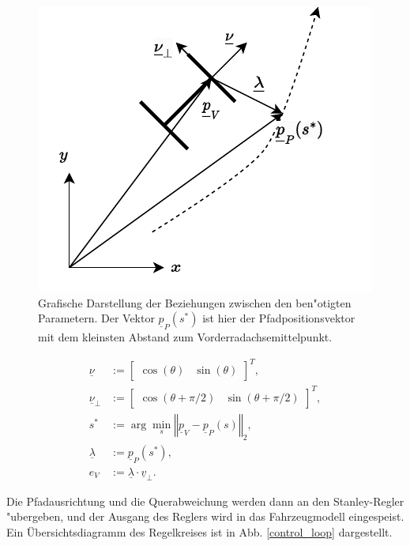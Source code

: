 \documentclass[arbeit=studie,oneside,BCOR=12mm]{ArbeitRST}
\begin{document}
\begin{figure}[h]
    \centering
    \includegraphics{dot_product}
    \caption{Grafische Darstellung der Beziehungen zwischen den ben"otigten
    Parametern. Der Vektor $\underline{p}_P(s^*)$ ist hier der Pfadpositionsvektor mit dem
    kleinsten Abstand zum Vorderradachsemittelpunkt.}
    \label{algorithm}
\end{figure}

\begin{subequations}
\begin{align}
    \underline{\nu} &:= \begin{bmatrix} \cos(\theta) & \sin(\theta) \end{bmatrix}^T, \\
        \underline{\nu}_{\perp} &:= \begin{bmatrix} \cos(\theta + \pi/2) & \sin(\theta + \pi/2) \end{bmatrix}^T, \\
            s^* &:= \arg\min_{s}  \left\Vert\underline{p}_V - \underline{p}_P(s) \right\Vert_2, \\
    \underline{\lambda} &:= \underline{p}_P(s^*), \\
    e_{V} &:= \underline{\lambda} \cdot \underline{v}_{\perp}.
 \label{alg:quer}
\end{align}
\end{subequations}

Die Pfadausrichtung und die Querabweichung werden dann an den Stanley-Regler "ubergeben,
und der Ausgang des Reglers wird in das Fahrzeugmodell eingespeist. Ein
Übersichtsdiagramm des Regelkreises ist in Abb. \ref{control_loop} dargestellt.
\end{document}
